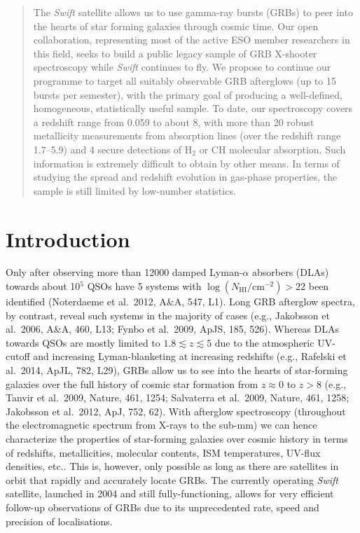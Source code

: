 \documentclass[iop, twocolappendix, numberedappendix, tighten, appendixfloats]{emulateapj}
\begin{document}
	\begin{abstract}
	The {\it Swift} satellite allows us to use gamma-ray bursts (GRBs) to peer into 
	the hearts of star forming galaxies through cosmic time. Our open
	collaboration, representing most of the active ESO member researchers in this
	field, seeks to build a public legacy sample of GRB X-shooter spectroscopy
	while {\it Swift} continues to fly. We propose to continue our programme to target
	all suitably observable GRB afterglows (up to 15 bursts per semester), with the
	primary goal of producing a well-defined, homogeneous, statistically useful
	sample. To date, our spectroscopy covers a redshift range from 0.059 to about
	8, with more than 20 robust metallicity measurements from absorption lines (over 
	the redshift range 1.7--5.9) and 4 secure detections of H$_2$ or CH molecular
	absorption. Such information is extremely difficult to obtain by other means.
	In terms of studying the spread and redshift evolution in gas-phase properties, the
	sample is still limited by low-number statistics. 
	\end{abstract}
	
	
	\section{Introduction}
	
	
	Only after observing more than 12000 damped Lyman-$\alpha$ absorbers (DLAs)
	towards about 10$^5$ QSOs have 5 systems with 
	$\log({N_\mathrm{HI}/\mathrm{cm^{-2}}}) > 22$
	been identified (Noterdaeme et al.\ 2012, A\&A, 547, L1). Long GRB afterglow
	spectra, by contrast, reveal such systems in the majority of cases (e.g., Jakobsson et
	al.\ 2006, A\&A, 460, L13; Fynbo et al.\ 2009, ApJS, 185, 526).
	Whereas DLAs towards QSOs are mostly limited to $1.8\lesssim z \lesssim 5$ due
	to the atmospheric  UV-cutoff and increasing Lyman-blanketing at increasing
	redshifts (e.g., Rafelski et al.\ 2014, ApJL, 782, L29), GRBs allow us to see 
	into the hearts of star-forming galaxies over
	the full history of cosmic star formation from $z \approx 0$ to $z > 8$ (e.g.,
	Tanvir et al.\ 2009, Nature, 461, 1254; Salvaterra et al.\ 2009, Nature, 461,
	1258; Jakobsson et al.\ 2012, ApJ, 752, 62). With afterglow spectroscopy
	(throughout the electromagnetic spectrum from X-rays to the sub-mm) we can hence
	characterize the properties of star-forming galaxies over cosmic history in
	terms of  redshifts, metallicities, molecular contents, ISM temperatures,
	UV-flux densities, etc.. This is, however, only possible as long as there are
	satellites in orbit that rapidly and accurately locate GRBs. The currently
	operating \textit{Swift} satellite, launched in 2004 and still fully-functioning,
	allows for very efficient follow-up observations of GRBs due to its
	unprecedented rate, speed and precision of localisations.
	
\end{document}
